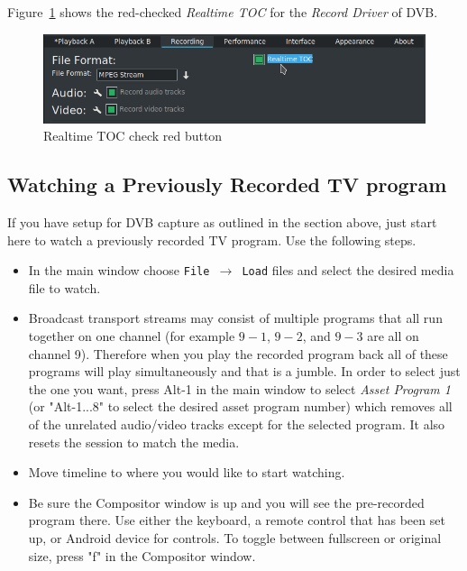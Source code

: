 Figure~\ref{fig:realtime_toc} shows the red-checked \textit{Realtime TOC} for the \textit{Record Driver} of DVB.

\begin{figure}[htpb]
    \centering
    \includegraphics[width=0.8\linewidth]{images/realtime_toc.png}
    \caption{Realtime TOC check red button}
    \label{fig:realtime_toc}
\end{figure}

\subsection{Watching a Previously Recorded TV program}%
\label{sub:watching_recorded_tv_program}

If you have setup for DVB capture as outlined in the section above, just start here to watch a previously recorded TV program.  Use the following steps.

\begin{itemize}
    \item In the main window choose   \texttt{File $\rightarrow$ Load} files  and select the desired media file to watch.
    \item Broadcast transport streams may consist of multiple programs that all run together on one  channel (for example $9-1$, $9-2$, and $9-3$ are all on channel 9). Therefore when you play the
    recorded program back all of these programs will play simultaneously and that is a jumble. In order to select just the one you want, press Alt-1 in the main window to select \textit{Asset Program 1} (or "Alt-1...8" to select the desired asset program number) which removes all of the unrelated audio/video tracks except for the selected program. It also resets the session to match the media.
    \item Move timeline to where you would like to start watching.
    \item Be sure the Compositor window is up and you will see the pre-recorded program there.	Use either the keyboard, a remote control that has been set up, or Android device for controls.  To toggle between fullscreen or original size, press "f" in the Compositor window.
\end{itemize}

